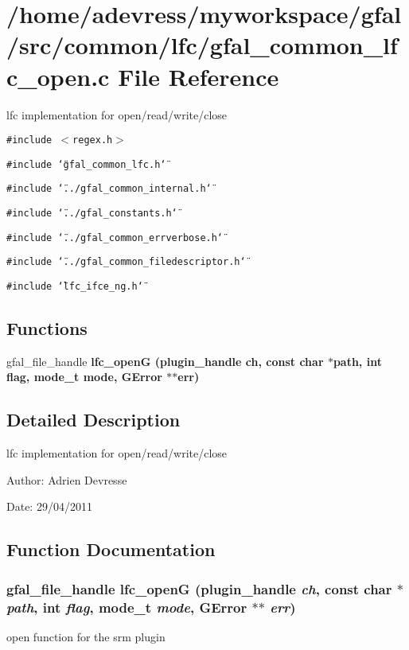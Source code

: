 \section{/home/adevress/myworkspace/gfal/src/common/lfc/gfal\_\-common\_\-lfc\_\-open.c File Reference}
\label{gfal__common__lfc__open_8c}
lfc implementation for open/read/write/close 

{\tt \#include $<$regex.h$>$}\par
{\tt \#include \char`\"{}gfal\_\-common\_\-lfc.h\char`\"{}}\par
{\tt \#include \char`\"{}../gfal\_\-common\_\-internal.h\char`\"{}}\par
{\tt \#include \char`\"{}../gfal\_\-constants.h\char`\"{}}\par
{\tt \#include \char`\"{}../gfal\_\-common\_\-errverbose.h\char`\"{}}\par
{\tt \#include \char`\"{}../gfal\_\-common\_\-filedescriptor.h\char`\"{}}\par
{\tt \#include \char`\"{}lfc\_\-ifce\_\-ng.h\char`\"{}}\par
\subsection*{Functions}
\begin{CompactItemize}
\item 
gfal\_\-file\_\-handle \bf{lfc\_\-open\-G} (plugin\_\-handle ch, const char $\ast$path, int flag, mode\_\-t mode, GError $\ast$$\ast$err)
\end{CompactItemize}


\subsection{Detailed Description}
lfc implementation for open/read/write/close 

\begin{Desc}
\item[Author:]Adrien Devresse \end{Desc}
\begin{Desc}
\item[Date:]29/04/2011 \end{Desc}


\subsection{Function Documentation}
\subsubsection{\setlength{\rightskip}{0pt plus 5cm}gfal\_\-file\_\-handle lfc\_\-open\-G (plugin\_\-handle {\em ch}, const char $\ast$ {\em path}, int {\em flag}, mode\_\-t {\em mode}, GError $\ast$$\ast$ {\em err})}\label{gfal__common__lfc__open_8c_a1205fd03e80a4145a8aba41eb279652}


open function for the srm plugin 